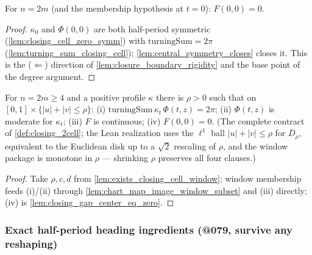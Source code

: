 \begin{lemma}

\leanok
[the closing anchor $F(0,0) = 0$]
  \label{lem:closing_gap_center_eq_zero}
  For $n = 2m$ (and the membership hypothesis at $t=0$): $F(0,0) = 0$.
\end{lemma}
\begin{proof}

\leanok
  $\kappa_0$ and $\Phi(0,0)$ are both half-period symmetric
  (\cref{lem:closing_cell_zero_symm}) with
  $\mathrm{turningSum} = 2\pi$ (\cref{lem:turning_sum_closing_cell});
  \cref{lem:central_symmetry_closes} closes it. This is the ($\Leftarrow$)
  direction of \cref{lem:closure_boundary_rigidity} and the base point of the
  degree argument.
\end{proof}

\begin{theorem}

  \label{thm:closing_cell_package}
  For $n = 2m \ge 4$ and a positive profile $\kappa$ there is $\rho > 0$ such
  that on $[0,1] \times \{|u|+|v| \le \rho\}$: (i)
  $\mathrm{turningSum}\,\kappa_t\,\Phi(t,z) = 2\pi$; (ii) $\Phi(t,z)$ is
  moderate for $\kappa_t$; (iii) $F$ is continuous; (iv) $F(0,0) = 0$. (The
  complete contract of \cref{def:closing_2cell}; the Lean realization uses the
  $\ell^1$ ball $|u|+|v| \le \rho$ for $\overline{D}_\rho$, equivalent to the
  Euclidean disk up to a $\sqrt2$ rescaling of $\rho$, and the window package
  is monotone in $\rho$ --- shrinking $\rho$ preserves all four clauses.)
\end{theorem}
\begin{proof}

\leanok
  Take $\rho, c, d$ from \cref{lem:exists_closing_cell_window}; window
  membership feeds (i)/(ii) through
  \cref{lem:chart_map_image_window_subset} and (iii) directly; (iv) is
  \cref{lem:closing_gap_center_eq_zero}.
\end{proof}

\subsubsection*{Exact half-period heading ingredients (@079, survive any reshaping)}

